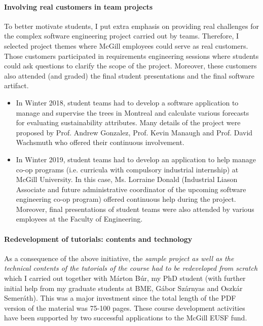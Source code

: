 \paragraph{Involving real customers in team projects}

To better motivate students, I put extra emphasis on providing real challenges for the complex software engineering project carried out by teams. Therefore, I selected project themes where McGill employees could serve as real customers. Those customers participated in requirements engineering sessions where students could ask questions to clarify the scope of the project. Moreover, these customers also attended (and graded) the final student presentations and the final software artifact.
\begin{itemize}[leftmargin=0.5cm]
\item In Winter 2018, student teams had to develop a software application to manage and supervise the trees in Montreal and calculate various forecasts for evaluating sustainability attributes. Many details of the project were proposed by Prof. Andrew Gonzalez, Prof. Kevin Manaugh and Prof. David Wachsmuth who offered their continuous involvement.
\item In Winter 2019, student teams had to develop an application to help manage co-op programs (i.e. curricula with compulsory industrial internship) at McGill University. In this case, Ms. Lorraine Donald (Industrial Liason Associate and future administrative coordinator of the upcoming software engineering co-op program) offered continuous help during the project. Moreover, final presentations of student teams were also attended by various employees at the Faculty of Engineering.
\end{itemize}


\paragraph{Redevelopment of tutorials: contents and technology}
As a consequence of the above initiative, the \emph{sample project as well as the technical contents of the tutorials of the course had to be redeveloped from scratch} which I carried out together with Márton Búr, my PhD student (with further initial help from my graduate students at BME, Gábor Szárnyas and Oszkár Semeráth). This was a major investment since the total length of the PDF version of the material was 75-100 pages. These course development activities have been supported by two successful applications to the McGill EUSF fund. 

